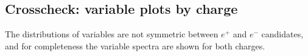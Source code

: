 \subsection{Crosscheck: variable plots by charge}

The distributions of variables are not symmetric between $e^+$ and $e^-$ candidates, and for completeness the variable spectra are shown for both charges.



